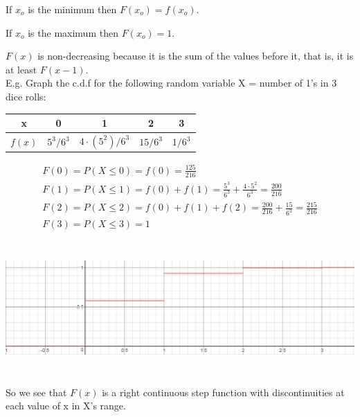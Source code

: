 \documentclass[12pt, letterpaper]{article}
\begin{document}
If \(x_o\) is the minimum then \(F\left(x_o\right) = f\left(x_o\right)\).

If \(x_o\) is the maximum then \(F\left(x_o\right) = 1\).

\(F\left(x\right)\) is non-decreasing because it is the sum of the values before it, that is, it is at least \(F\left(x - 1\right)\).\\

E.g. Graph the c.d.f for the following random variable X = number of 1's in 3 dice rolls:

\begin{center}
\begin{tabular}{|c|c|c|c|c|}
\hline
x & 0 & 1 & 2 & 3\\ \hline
\(f\left(x\right)\) & \(5^3/6^3\) & \(4\cdot(5^2)/6^3\) & \(15/6^3\) & \(1/6^3\)\\ 
\hline
\end{tabular}
\end{center}

\begin{gather*}
F\left(0\right) = P\left(X \leq 0\right) = f\left(0\right) = \frac{125}{216}\\
F\left(1\right) = P\left(X \leq 1\right) = f\left(0\right) + f\left(1\right) = \frac{5^3}{6^3} + \frac{4 \cdot 5^2}{6^3} = \frac{200}{216}\\
F\left(2\right) = P\left(X \leq 2\right) = f\left(0\right) + f\left(1\right) + f\left(2\right) = \frac{200}{216} + \frac{15}{6^3} = \frac{215}{216}\\
F\left(3\right) = P\left(X \leq 3\right) = 1
\end{gather*}
\begin{center}
\includegraphics[width=15cm, height=5cm]{exampleF(x)}
\end{center}

So we see that \(F\left(x\right)\) is a right continuous step function with discontinuities at each value of x in X's range.\\
\end{document}
